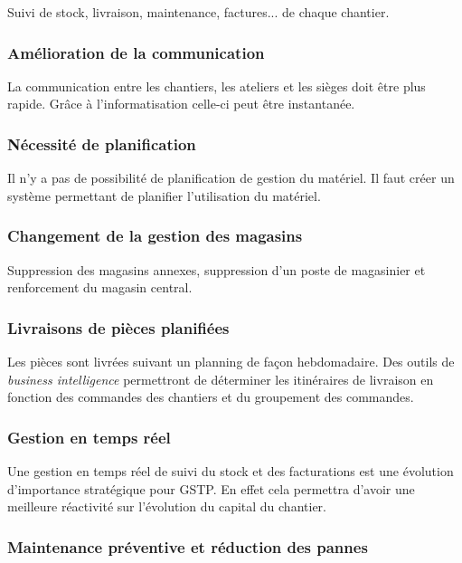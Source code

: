 \documentclass[twoside]{article}
\begin{document}
Suivi de stock, livraison, maintenance, factures... de chaque chantier.

\subsubsection{Amélioration de la communication}

La communication entre les chantiers, les ateliers et les sièges doit être
plus rapide. Grâce à l’informatisation celle-ci peut être instantanée.

\subsubsection{Nécessité de planification}

Il n’y a pas de possibilité de planification de gestion du matériel. 
Il faut créer un système permettant de planifier l’utilisation du matériel.

\subsubsection{Changement de la gestion des magasins}

Suppression des magasins annexes, suppression d’un poste de magasinier et
renforcement du magasin central.

\subsubsection{Livraisons de pièces planifiées}

Les pièces sont livrées suivant un planning de façon hebdomadaire. 
Des outils de {\sl business intelligence} permettront de déterminer les
itinéraires de livraison en fonction des commandes des chantiers et du
groupement des commandes.

\subsubsection{Gestion en temps réel}
Une gestion en temps réel de suivi du stock et des facturations
est une évolution 
d’importance stratégique pour GSTP. En effet cela permettra 
d’avoir une meilleure
 réactivité sur l'évolution du capital du chantier.

\subsubsection{Maintenance préventive et réduction des pannes}
\end{document}
